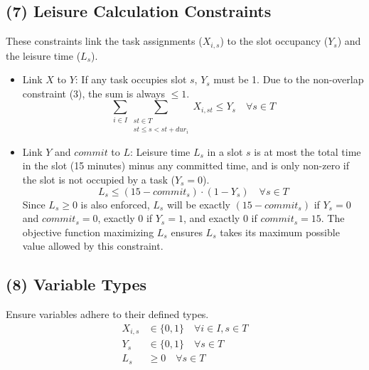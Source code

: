 \documentclass{article}
\begin{document}
\subsection{(7) Leisure Calculation Constraints}
These constraints link the task assignments ($X_{i,s}$) to the slot occupancy ($Y_s$) and the leisure time ($L_s$).
\begin{itemize}
    \item Link $X$ to $Y$: If any task occupies slot $s$, $Y_s$ must be 1. Due to the non-overlap constraint (3), the sum is always $\le 1$.
    \[
    \sum_{i \in I} \sum_{\substack{st \in T \\ st \le s < st + dur_i}} X_{i, st} \le Y_s \quad \forall s \in T
    \]
    \item Link $Y$ and $commit$ to $L$: Leisure time $L_s$ in a slot $s$ is at most the total time in the slot (15 minutes) minus any committed time, and is only non-zero if the slot is not occupied by a task ($Y_s=0$).
    \[
    L_s \le (15 - commit_s) \cdot (1 - Y_s) \quad \forall s \in T
    \]
    Since $L_s \ge 0$ is also enforced, $L_s$ will be exactly $(15 - commit_s)$ if $Y_s=0$ and $commit_s=0$, exactly $0$ if $Y_s=1$, and exactly $0$ if $commit_s=15$. The objective function maximizing $L_s$ ensures $L_s$ takes its maximum possible value allowed by this constraint.
\end{itemize}

\subsection{(8) Variable Types}
Ensure variables adhere to their defined types.
\begin{align*}
X_{i,s} &\in \{0, 1\} \quad \forall i \in I, s \in T \\
Y_s &\in \{0, 1\} \quad \forall s \in T \\
L_s &\ge 0 \quad \forall s \in T
\end{align*}
\end{document}
